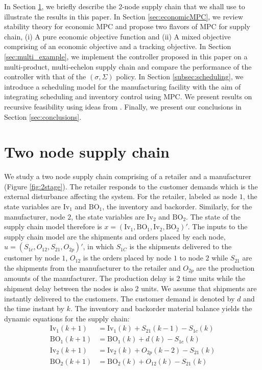 \documentclass[10pt]{article}
\newcommand{\BO}{\textrm{BO}}
\newcommand{\Inv}{\textrm{Iv}}
\theoremstyle{definition}
\begin{document}
In Section \ref{sec:model}, we briefly describe the 2-node supply
chain that we shall use to illustrate the results in this paper. In
Section \ref{sec:economicMPC}, we review stability theory for economic
MPC and propose two flavors of MPC for
supply chain, (i) A pure economic objective function and (ii) A mixed
objective comprising of an economic objective and a tracking
objective. In Section \ref{sec:multi_example}, we implement the
controller proposed in this paper on a multi-product, multi-echelon
supply chain and compare the performance of the controller with that
of the $(\sigma,\Sigma) $ policy. In Section \ref{subsec:scheduling}, we
introduce a scheduling model for the manufacturing facility with the
aim of integrating scheduling and inventory control using MPC. We
present results on recursive feasibility using ideas from
\citet{subramanian:maravelias:rawlings:2012}. Finally, we present our
conclusions in Section \ref{sec:conclusions}.




\section{Two node supply chain}
\label{sec:model}
We study a two node supply chain comprising of a retailer and a
manufacturer (Figure \ref{fig:2stage}). The retailer responds to the customer demands which is
the external disturbance affecting the system. For the retailer,
labeled as node $1$, the state variables are $\Inv_1$ and $\BO_1$, the
inventory and backorder. Similarly, for the manufacturer, node $2$,
the state variables are $\Inv_2$ and $\BO_2$. The state of the supply
chain model therefore is $x = (\Inv_1,\BO_1,\Inv_2,\BO_2)'$. The inputs to the supply
chain model are the shipments and orders placed by each node,
$u = (S_{1c},O_{12},S_{21},O_{2p})'$, in which $S_{1C}$ is the
shipments delivered to the customer by node $1$, $O_{12}$ is the
orders placed by node $1$ to node $2$ while $S_{21}$ are the shipments
from the manufacturer to the retailer and $O_{2p}$ are the production
amounts of the manufacturer. The production delay is $2$ time units
while the shipment delay between the nodes is also $2$ units. We assume that
shipments are instantly delivered to the customers. The customer
demand is denoted by $d$ and the time instant by $k$. The inventory
and backorder material balance yields the dynamic equations for the
supply chain:
\begin{align*}
 \Inv_1(k+1) &= \Inv_1(k) + S_{21}(k-1) -S_{1c}(k) \\
 \BO_1(k+1) &= \BO_1(k) + d(k) -S_{1c}(k) \\
 \Inv_2(k+1) &= \Inv_2(k) + O_{2p}(k-2) -S_{21}(k) \\
 \BO_2(k+1) &= \BO_2(k) +O_{12}(k) - S_{21}(k)
\end{align*}
\end{document}
